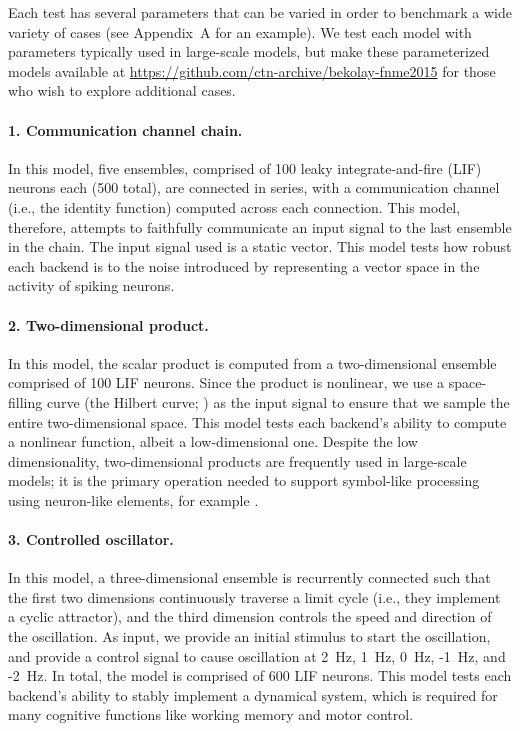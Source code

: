 \documentclass{frontiersSCNS}
\begin{document}
Each test has several parameters
that can be varied
in order to benchmark a wide variety of cases
(see Appendix~A for an example).
We test each model with parameters
typically used in large-scale models,
but make these parameterized models
available at \url{https://github.com/ctn-archive/bekolay-fnme2015}
for those who wish to explore additional cases.

\paragraph{1. Communication channel chain.}
In this model,
five ensembles,
comprised of 100 leaky integrate-and-fire (LIF) neurons each
(500 total),
are connected in series,
with a communication channel
(i.e., the identity function)
computed across each connection.
This model, therefore, attempts to faithfully
communicate an input signal to
the last ensemble in the chain.
The input signal used is a static vector.
This model tests how
robust each backend is to the noise introduced
by representing a vector space
in the activity of spiking neurons.

\paragraph{2. Two-dimensional product.}
In this model,
the scalar product is computed
from a two-dimensional ensemble
comprised of 100 LIF neurons.
Since the product is nonlinear,
we use a space-filling curve
(the Hilbert curve; \citealp{hilbert1891})
as the input signal to ensure that
we sample the entire two-dimensional space.
This model tests each backend's
ability to compute a nonlinear function,
albeit a low-dimensional one.
Despite the low dimensionality,
two-dimensional products are frequently used
in large-scale models;
it is the primary operation needed to support
symbol-like processing using neuron-like elements,
for example \citep{eliasmith2013}.

\paragraph{3. Controlled oscillator.}
In this model,
a three-dimensional ensemble is recurrently connected
such that the first two dimensions continuously
traverse a limit cycle
(i.e., they implement a cyclic attractor),
and the third dimension controls the speed
and direction of the oscillation.
As input, we provide an initial stimulus
to start the oscillation,
and provide a control signal
to cause oscillation at
2~Hz, 1~Hz, 0~Hz, -1~Hz, and -2~Hz.
In total, the model is comprised of 600 LIF neurons.
This model tests each backend's ability
to stably implement a dynamical system,
which is required for many cognitive functions
like working memory and motor control.
\end{document}
